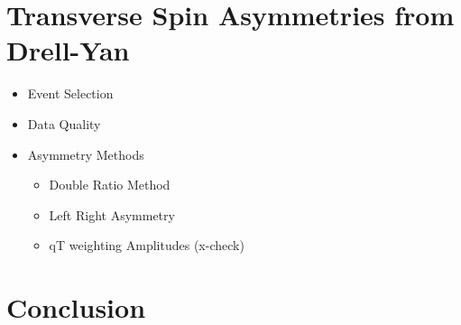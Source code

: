 \documentclass{article}
\begin{document}
\section{Transverse Spin Asymmetries from Drell-Yan}
\begin{itemize}
\item Event Selection
\item Data Quality
\item Asymmetry Methods
  \begin{itemize}
  \item Double Ratio Method
  \item Left Right Asymmetry
  \item qT weighting Amplitudes (x-check)
  \end{itemize}
  
\end{itemize}


\section{Conclusion}
\end{document}
